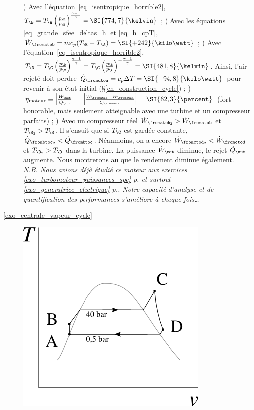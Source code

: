 \begin{description}
			) Avec l’équation~\ref{eq_isentropique_horrible2}, $T_\B = T_\A \left(\frac{p_\B}{p_\B}\right)^{\frac{\gamma - 1}{\gamma}} = \SI{774,7}{\kelvin}$ ;
			) Avec les équations \ref{eq_grande_sfee_deltas_h} et \ref{eq_h=cpT}, $\dot W_\fromatob = \dot m c_p (T_\B - T_\A) = \SI{+242}{\kilo\watt}$  ;
			) Avec l’équation~\ref{eq_isentropique_horrible2}, $T_\D = T_\C \left(\frac{p_\D}{p_\C}\right)^{\frac{\gamma - 1}{\gamma}} = T_\C \left(\frac{p_\B}{p_\A}\right)^{-\frac{\gamma - 1}{\gamma}} = \SI{481,8}{\kelvin}$. Ainsi, l’air rejeté doit perdre $\dot Q_\fromdtoa = c_p \Delta T = \SI{-94,8}{\kilo\watt}$ pour revenir à son état initial (\S\ref{ch_construction_cycle}) ;
			) $\eta_\text{moteur} \equiv \left|\frac{\dot W_\net}{\dot Q_\inn} \right| = \left|\frac{\dot W_\fromatob + \dot W_\fromctod}{\dot Q_\frombtoc} \right| = \SI{62,3}{\percent} $ (fort honorable, mais seulement atteignable avec une turbine et un compresseur parfaits) ;
			) Avec un compresseur réel $\dot W_{\fromatob_2} > \dot W_\fromatob$ et $T_{\B_2} > T_\B$.
						Il s’ensuit que si $T_\C$ est gardée constante, $\dot Q_{\frombtoc_2} < \dot Q_\frombtoc$.
						Néanmoins, on a encore $\dot W_{\fromctod_2} < \dot W_\fromctod$ et $T_{\D_2} > T_\D$ dans la turbine. La puissance $\dot W_\net$ diminue, le rejet $\dot Q_\out$ augmente. Nous montrerons au \courssept que le rendement diminue également.\\
					\textit{N.B. Nous avions déjà étudié ce moteur aux exercices \ref{exo_turbomoteur_puissances_spe} p.\pageref{exo_turbomoteur_puissances_spe} et surtout \ref{exo_generatrice_electrique} p.\pageref{exo_generatrice_electrique}. Notre capacité d’analyse et de quantification des performances s’améliore à chaque fois…}		
	\item [\ref{exo_centrale_vapeur_cycle}]
			\includegraphics[height=\solutiondiagramwidth]{images/exo_sol_tv_moteur_vapeur.png}

\end{description}
